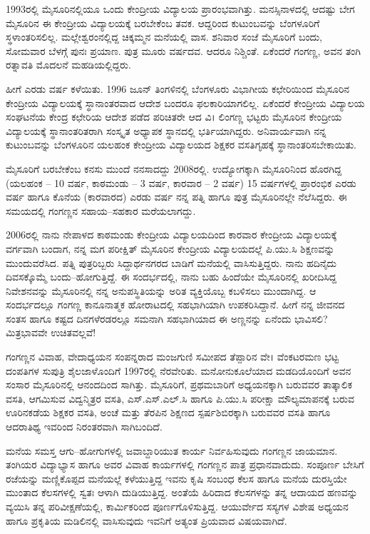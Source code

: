 1993ರಲ್ಲಿ ಮೈಸೂರಿನಲ್ಲಿಯೂ ಒಂದು ಕೇಂದ್ರೀಯ ವಿದ್ಯಾಲಯ ಪ್ರಾರಂಭವಾಗಿತ್ತು. ಮನಸ್ಸಿನಾಳದಲ್ಲಿ ಆದಷ್ಟು ಬೇಗ ಮೈಸೂರಿನ ಈ ಕೇಂದ್ರೀಯ ವಿದ್ಯಾಲಯಕ್ಕೆ ಬರಬೇಕೆಂಬ ತವಕ. ಆದ್ದರಿಂದ ಕುಟುಂಬವನ್ನು ಬೆಂಗಳೂರಿಗೆ ಸ್ಥಳಾಂತರಿಸಲಿಲ್ಲ. ಮಲ್ಲೇಶ್ವರಂನಲ್ಲಿದ್ದ ಚಿಕ್ಕಮ್ಮನ ಮನೆಯಲ್ಲಿ ವಾಸ. ಶನಿವಾರ ಸಂಜೆ ಮೈಸೂರಿಗೆ ಬಂದು, ಸೋಮವಾರ ಬೆಳಗ್ಗೆ ಪುನಃ ಪ್ರಯಾಣ. ಪುತ್ರ ಮೂರು ವರ್ಷದವ. ಆದರೂ ನಿಶ್ಚಿಂತೆ. ಏಕೆಂದರೆ ಗಂಗಣ್ಣ, ಅವನ ತಂಗಿ ರತ್ನಾವತಿ ಮೊದಲನೆ ಮಹಡಿಯಲ್ಲಿದ್ದರು.

ಹೀಗೆ ಎರಡು ವರ್ಷ ಕಳೆಯಿತು. 1996 ಜೂನ್ ತಿಂಗಳಿನಲ್ಲಿ ಬೆಂಗಳೂರು ವಿಭಾಗೀಯ ಕಛೇರಿಯಿಂದ ಮೈಸೂರಿನ ಕೇಂದ್ರೀಯ ವಿದ್ಯಾಲಯಕ್ಕೆ ಸ್ಥಾನಾಂತರವಾದ ಆದೇಶ ಬಂದರೂ ಫಲಕಾರಿಯಾಗಲಿಲ್ಲ. ಏಕೆಂದರೆ ಕೇಂದ್ರೀಯ ವಿದ್ಯಾಲಯ ಸಂಘಟನೆಯ ಕೇಂದ್ರ ಕಛೇರಿಯ ಆದೇಶ ಪಡೆದ ಪರಿಚಿತರೇ ಆದ ವಿ। ಲಿಂಗಣ್ಣ ಭಟ್ಟರು ಮೈಸೂರಿನ ಕೇಂದ್ರೀಯ ವಿದ್ಯಾಲಯಕ್ಕೆ ಸ್ಥಾನಾಂತರಿತರಾಗಿ ಸಂಸ್ಕೃತ ಅಧ್ಯಾಪಕ ಸ್ಥಾನದಲ್ಲಿ ಭರ್ತಿಯಾಗಿದ್ದರು. ಅನಿವಾರ್ಯವಾಗಿ ನನ್ನ ಕುಟುಂಬವನ್ನು ಬೆಂಗಳೂರಿನ ಯಲಹಂಕ ಕೇಂದ್ರೀಯ ವಿದ್ಯಾಲಯದ ಶಿಕ್ಷಕರ ವಸತಿಗೃಹಕ್ಕೆ ಸ್ಥಾನಾಂತರಿಸಬೇಕಾಯಿತು.

ಮೈಸೂರಿಗೆ ಬರಬೇಕೆಂಬ ಕನಸು ಮುಂದೆ ನನಸಾದದ್ದು 2008ರಲ್ಲಿ. ಉದ್ಯೋಗಕ್ಕಾಗಿ ಮೈಸೂರಿನಿಂದ ಹೊರಗಿದ್ದ (ಯಲಹಂಕ – 10 ವರ್ಷ, ಕಾಠಮಂಡು – 3 ವರ್ಷ, ಕಾರವಾರ – 2 ವರ್ಷ) 15 ವರ್ಷಗಳಲ್ಲಿ ಪ್ರಾರಂಭಿಕ ಎರಡು ವರ್ಷ ಹಾಗೂ ಕೊನೆಯ (ಕಾರವಾರದ) ಎರಡು ವರ್ಷ ನನ್ನ ಪತ್ನಿ ಹಾಗೂ ಪುತ್ರ ಮೈಸೂರಿನಲ್ಲೇ ನೆಲೆಸಿದ್ದರು. ಈ ಸಮಯದಲ್ಲಿ ಗಂಗಣ್ಣನ ಸಹಾಯ–ಸಹಕಾರ ಮರೆಯಲಾಗದ್ದು.

2006ರಲ್ಲಿ ನಾನು ನೇಪಾಳದ ಕಾಠಮಂಡು ಕೇಂದ್ರೀಯ ವಿದ್ಯಾಲಯದಿಂದ ಕಾರವಾರ ಕೇಂದ್ರೀಯ ವಿದ್ಯಾಲಯಕ್ಕೆ ವರ್ಗವಾಗಿ ಬಂದಾಗ, ನನ್ನ ಮಗ ಪರೀಕ್ಷಿತ್ ಮೈಸೂರಿನ ಕೇಂದ್ರೀಯ ವಿದ್ಯಾಲಯದಲ್ಲೆ ಪಿ.ಯು.ಸಿ ಶಿಕ್ಷಣವನ್ನು ಮುಂದುವರೆಸಿದ. ಪತ್ನಿ ಪುತ್ರರಿಬ್ಬರು ಸಿದ್ದಾರ್ಥನಗರದ ಬಾಡಿಗೆ ಮನೆಯಲ್ಲಿ ವಾಸಿಸುತ್ತಿದ್ದರು. ನಾನು ಹದಿನೈದು ದಿವಸಕ್ಕೊಮ್ಮೆ ಬಂದು–ಹೋಗುತ್ತಿದ್ದೆ. ಈ ಸಂದರ್ಭದಲ್ಲಿ, ನಾನು ಬಹು ಹಿಂದೆಯೇ ಮೈಸೂರಿನಲ್ಲಿ ಖರೀದಿಸಿದ್ದ ನಿವೇಶನವನ್ನು ಮೈಸೂರಿನಲ್ಲಿ ನನ್ನ ಅನುಪಸ್ಥಿತಿಯನ್ನು ಅರಿತ ವ್ಯಕ್ತಿಯೊಬ್ಬ ಕಬಳಿಸಲು ಮುಂದಾಗಿದ್ದ. ಆ ಸಂದರ್ಭದಲ್ಲೂ ಗಂಗಣ್ಣ ಕಾನೂನಾತ್ಮಕ ಹೋರಾಟದಲ್ಲಿ ಸಹಭಾಗಿಯಾಗಿ ಉಪಕರಿಸಿದ್ದಾನೆ. ಹೀಗೆ ನನ್ನ ಜೀವನದ ಸಂತಸ ಹಾಗೂ ಕಷ್ಟದ ದಿನಗಳೆರಡರಲ್ಲೂ ಸಮನಾಗಿ ಸಹಭಾಗಿಯಾದ ಈ ಅಣ್ಣನನ್ನು ಏನೆಂದು ಭಾವಿಸಲಿ? ಮಿತ್ರಭಾವವೇ ಉಚಿತವಲ್ಲವೆ!

ಗಂಗಣ್ಣನ ವಿವಾಹ, ವೇದಾಧ್ಯಯನ ಸಂಪನ್ನರಾದ ಮಂಜಗುಣಿ ಸಮೀಪದ ತೆಪ್ಪಾರಿನ ವೇ। ವೆಂಕಟರಮಣ ಭಟ್ಟ ದಂಪತಿಗಳ ಸುಪುತ್ರಿ ಶೈಲಜಾಳೊಂದಿಗೆ 1997ರಲ್ಲಿ ನೆರವೇರಿತು. ಮನೋನುಕೂಲೆಯಾದ ಮಡದಿಯೊಂದಿಗೆ ಅವನ ಸಂಸಾರ ಮೈಸೂರಿನಲ್ಲಿ ಆನಂದದಿಂದ ಸಾಗಿತ್ತು. ಮೈಸೂರಿಗೆ, ಪ್ರಥಮಬಾರಿಗೆ ಅಧ್ಯಯನಕ್ಕಾಗಿ ಬರುವವರ ತಾತ್ಕಾಲಿಕ ವಸತಿ, ಆಗಮಿಸುವ ವಿದ್ವನ್ಮಿತ್ರರ ವಸತಿ, ಎಸ್.ಎಸ್.ಎಲ್.ಸಿ ಹಾಗೂ ಪಿ.ಯು.ಸಿ ಪರೀಕ್ಷಾ ಮೌಲ್ಯಮಾಪನಕ್ಕೆ ಬರುವ ಊರಿನಕಡೆಯ ಶಿಕ್ಷಕರ ವಸತಿ, ಅಂಚೆ ಮತ್ತು ತೆರಪಿನ ಶಿಕ್ಷಣದ ಸ್ಪರ್ಷಶಿಬಿರಕ್ಕಾಗಿ ಬರುವವರ ವಸತಿ ಹಾಗೂ ಆದರಾತಿಥ್ಯ ಇವರಿಂದ ನಿರಂತರವಾಗಿ ಸಾಗಿಬಂದಿದೆ.

ಮನೆಯ ಸಮಸ್ತ ಆಗು–ಹೋಗುಗಳಲ್ಲಿ ಜವಾಬ್ದಾರಿಯುತ ಕಾರ್ಯ ನಿರ್ವಹಿಸುವುದು ಗಂಗಣ್ಣನ ಜಾಯಮಾನ. ತಂಗಿಯರ ವಿದ್ಯಾಭ್ಯಾಸ ಹಾಗೂ ಅವರ ವಿವಾಹ ಕಾರ್ಯಗಳಲ್ಲಿ ಗಂಗಣ್ಣನ ಪಾತ್ರ ಪ್ರಧಾನವಾದುದು. ಸಂಪೂರ್ಣ ಬೇಸಿಗೆ ರಜೆಯನ್ನು ಮಣ್ಣಿಕೊಪ್ಪದ ಮನೆಯಲ್ಲೆ ಕಳೆಯುತ್ತಿದ್ದ ಇವನು ಕೃಷಿ ಸಂಬಂಧ ಕೆಲಸ ಹಾಗೂ ಮನೆಯ ದುರಸ್ತಿಯೇ ಮುಂತಾದ ಕೆಲಸಗಳಲ್ಲಿ ಸ್ವತಃ ಆಳಾಗಿ ದುಡಿಯುತ್ತಿದ್ದ. ಅಂತೆಯೆ ಹಿರಿದಾದ ಕೆಲಸಗಳನ್ನು ತನ್ನ ಆದಾಯದ ಹಣವನ್ನು ವ್ಯಯಿಸಿ ತನ್ನ ಪರಿವೀಕ್ಷಣೆಯಲ್ಲಿ, ಕಾರ್ಮಿಕರಿಂದ ಪೂರ್ಣಗೊಳಿಸುತ್ತಿದ್ದ. ಆಯುರ್ವೇದ ಸಸ್ಯಗಳ ವಿಶೇಷ ಅಧ್ಯಯನ ಹಾಗೂ ಪ್ರಕೃತಿಯ ಮಡಿಲಿನಲ್ಲಿ ವಾಸಿಸುವುದು ಇವನಿಗೆ ಅತ್ಯಂತ ಪ್ರಿಯವಾದ ವಿಷಯವಾಗಿದೆ.

